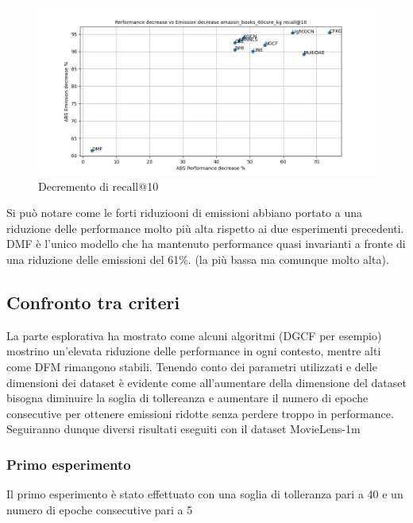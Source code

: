 \begin{figure}[H]
    \centering
    \includegraphics[scale=0.5]{images/decrement_recall@10_amazon_books_60core_kg.png}
    \caption{Decremento di recall@10}
\end{figure}
\noindent Si può notare come le forti riduziooni di emissioni abbiano portato a una riduzione delle performance molto più alta rispetto ai due esperimenti precedenti.
DMF è l'unico modello che ha mantenuto performance quasi invarianti a fronte di una riduzione delle emissioni del 61\%. (la più bassa ma comunque molto alta).
    

\subsection{Confronto tra criteri}
La parte esplorativa ha mostrato come alcuni algoritmi (DGCF per esempio) mostrino un'elevata riduzione delle performance in ogni contesto, mentre alti come DFM rimangono stabili.
Tenendo conto dei parametri utilizzati e delle dimensioni dei dataset è evidente come all'aumentare della dimensione del dataset bisogna diminuire la soglia di tollereanza e aumentare il numero di epoche consecutive per ottenere emissioni ridotte senza perdere troppo in performance.
Seguiranno dunque diversi risultati eseguiti con il dataset MovieLens-1m

\subsubsection{Primo esperimento}
Il primo esperimento è stato effettuato con una soglia di tolleranza pari a 40 e un numero di epoche consecutive pari a 5

